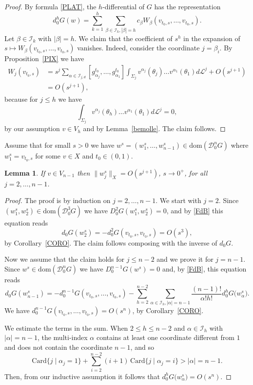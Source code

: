 \documentclass[12pt, reqno]{amsart}
\theoremstyle{plain}
\newtheorem {lemma}[theorem]{Lemma}
\theoremstyle{definition}
\theoremstyle{remark}
\numberwithin{equation}{section}
\renewcommand{\L}{\mathcal{L}}
\newcommand{\I}{\mathcal{I}}
\newcommand{\0}{\theta}
\renewcommand{\a}{\alpha}
\renewcommand{\b}{\beta}
\newcommand{\1}{{-1}}
\renewcommand{\=}{\coloneqq}
\renewcommand{\.}{\dots}
\newcommand{\mc}{\mathcal}
\newcommand{\dom}{\mathrm{dom}}
\begin{document}
\begin{proof}  
By formula \eqref{PLAT}, the $h$-differential of $G$ has the representation
\begin{equation}\label{PLAT3}
d_0^h G(w) 
 =
  \sum_{k=1}^h\sum_{\b\in\I_k, |\b|=h}  c_\b   W_{\b}(v_{t_0,s},\dots,v_{t_0,s}) .
\end{equation}
Let $\b\in\I_k$ with $ |\b|=h$.
We claim that the coefficient of $s^h$ in the expansion of $s\mapsto W_{\b}(v_{t_0,s},\dots,v_{t_0,s})$ vanishes.
Indeed,  consider the coordinate $j=\b_i $. By 
Proposition~\ref{PIX} we have
\[
\begin{split} 
   W_{j}(v_{t_0,s})& = s^{j}\sum_{\a\in \I_{j,d} }
   [g_{\a_j }^{t_0}, \.,g_{\a_1}^{t_0}]\int_{\Sigma_j}v^{\a_j}(\0_j)\.v^{\a_1}(\0_1)d\L^j + O(s^{j+1})
   \\
   &
 = O(s^{j+1}),
 \end{split}
\]
because for $j\leq h$ we have 
\[
\int_{\Sigma_j }v^{\a_j}(\0_h)\.v^{\a_1}(\0_1)d\L^j=0, 
\] 
by our assumption $v\in V_h$ and by Lemma~\ref{bemolle}.
The claim follows. 

 \end{proof}


{\color{black}

Assume that for small $s>0$ we have $w^s=(w_1^s,\ldots, w_{n-1}^s) \in \dom(\mc D_0^n G)$ where $w_1^s =  v _{t_0,s}$ for some   $v\in X$ and $t_0\in (0,1)$.

}

 \begin{lemma}\label{LEOX}
 If $v\in V_{n-1}$ then $\| w_{j}^s \|_{X }=O (s^{j+1})$, $s\to0^+$, for all $j=2,\dots,n-1$.  
 \end{lemma}




\begin{proof}
The proof is by induction on $j=2,\dots,n-1$. We start with $j=2$.
Since $(w_1^s, w_2^s)\in\dom(\mc D_0^3G)$ we have $D_0^2G(w_1^s, w_2^s)=0$, and by \eqref{FdB} this equation 
reads
\[
  d_0 G( w_2^s)= - d_0 ^2G (v_{t_0,s}, v_{t_0,s}) = O (s^3),
\]
by Corollary~\ref{CORO}. The claim follows composing with the inverse of   $d_0G$.

Now we assume that the claim holds for $j\leq n-2$ and we prove it for $j=n-1$. 
Since $w^s  \in\dom(\mc D_0^nG)$ we have $D_0^{n-1} G(w^s )=0$ and, by \eqref{FdB}, this equation 
reads
\[
  d_0 G( w_{n-1} ^s)= - d_0 ^{n-1}G (v_{t_0,s}, \dots, v_{t_0,s})
  -\sum_{h=2}^{ n-2}  \sum_{\a\in\I_h,|\a|=n-1} \frac{(n-1)!}{\a! h!} d_0^h G \big(w^s_\a\big). 
\]
We   have $d_0 ^{n-1}G (v_{t_0,s}, \dots, v_{t_0,s})=O(s^n)$, by Corollary~\ref{CORO}.

We estimate the terms in the sum.
When $2\leq h\leq n-2$ and $\a\in \I_h $ with $|\a|= n-1$,  the multi-index $\a$ contains at least one coordinate different from $1$ and does not contain the coordinate $n-1$, and so  
\[
  \mathrm{Card} \{ j \mid \a_j=1\}+\sum_{i=2}^ {n-2}  (i+1) \,  \mathrm{Card} \{ j \mid \a_j=i\}>|\a| = n-1.
\]
Then,  from our inductive assumption it follows that $d_0^h G \big( w^s_\a\big)= O(s^n)$.  

\end{proof}
 
\end{document}
